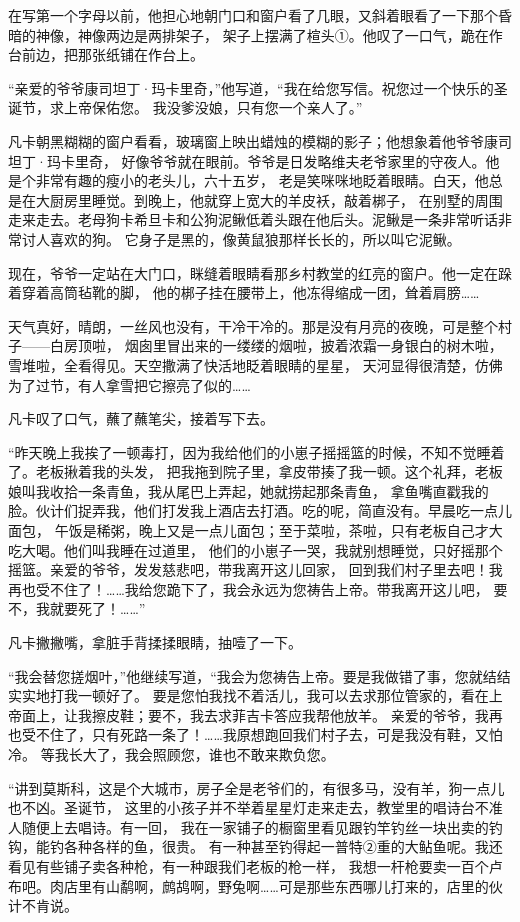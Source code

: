 \documentclass[12pt,UTF8]{ctexbook}
\begin{document}
在写第一个字母以前，他担心地朝门口和窗户看了几眼，又斜着眼看了一下那个昏暗的神像，神像两边是两排架子，
架子上摆满了楦头①。他叹了一口气，跪在作台前边，把那张纸铺在作台上。

“亲爱的爷爷康司坦丁·玛卡里奇，”他写道，“我在给您写信。祝您过一个快乐的圣诞节，求上帝保佑您。
我没爹没娘，只有您一个亲人了。”

凡卡朝黑糊糊的窗户看看，玻璃窗上映出蜡烛的模糊的影子；他想象着他爷爷康司坦丁·玛卡里奇，
好像爷爷就在眼前。爷爷是日发略维夫老爷家里的守夜人。他是个非常有趣的瘦小的老头儿，六十五岁，
老是笑咪咪地眨着眼睛。白天，他总是在大厨房里睡觉。到晚上，他就穿上宽大的羊皮袄，敲着梆子，
在别墅的周围走来走去。老母狗卡希旦卡和公狗泥鳅低着头跟在他后头。泥鳅是一条非常听话非常讨人喜欢的狗。
它身子是黑的，像黄鼠狼那样长长的，所以叫它泥鳅。

现在，爷爷一定站在大门口，眯缝着眼睛看那乡村教堂的红亮的窗户。他一定在跺着穿着高筒毡靴的脚，
他的梆子挂在腰带上，他冻得缩成一团，耸着肩膀……

天气真好，晴朗，一丝风也没有，干冷干冷的。那是没有月亮的夜晚，可是整个村子——白房顶啦，
烟囱里冒出来的一缕缕的烟啦，披着浓霜一身银白的树木啦，雪堆啦，全看得见。天空撒满了快活地眨着眼睛的星星，
天河显得很清楚，仿佛为了过节，有人拿雪把它擦亮了似的……

凡卡叹了口气，蘸了蘸笔尖，接着写下去。

“昨天晚上我挨了一顿毒打，因为我给他们的小崽子摇摇篮的时候，不知不觉睡着了。老板揪着我的头发，
把我拖到院子里，拿皮带揍了我一顿。这个礼拜，老板娘叫我收拾一条青鱼，我从尾巴上弄起，她就捞起那条青鱼，
拿鱼嘴直戳我的脸。伙计们捉弄我，他们打发我上酒店去打酒。吃的呢，简直没有。早晨吃一点儿面包，
午饭是稀粥，晚上又是一点儿面包；至于菜啦，茶啦，只有老板自己才大吃大喝。他们叫我睡在过道里，
他们的小崽子一哭，我就别想睡觉，只好摇那个摇篮。亲爱的爷爷，发发慈悲吧，带我离开这儿回家，
回到我们村子里去吧！我再也受不住了！……我给您跪下了，我会永远为您祷告上帝。带我离开这儿吧，
要不，我就要死了！……”

凡卡撇撇嘴，拿脏手背揉揉眼睛，抽噎了一下。

“我会替您搓烟叶，”他继续写道，“我会为您祷告上帝。要是我做错了事，您就结结实实地打我一顿好了。
要是您怕我找不着活儿，我可以去求那位管家的，看在上帝面上，让我擦皮鞋；要不，我去求菲吉卡答应我帮他放羊。
亲爱的爷爷，我再也受不住了，只有死路一条了！……我原想跑回我们村子去，可是我没有鞋，又怕冷。
等我长大了，我会照顾您，谁也不敢来欺负您。

“讲到莫斯科，这是个大城市，房子全是老爷们的，有很多马，没有羊，狗一点儿也不凶。圣诞节，
这里的小孩子并不举着星星灯走来走去，教堂里的唱诗台不准人随便上去唱诗。有一回，
我在一家铺子的橱窗里看见跟钓竿钓丝一块出卖的钓钩，能钓各种各样的鱼，很贵。
有一种甚至钓得起一普特②重的大鲇鱼呢。我还看见有些铺子卖各种枪，有一种跟我们老板的枪一样，
我想一杆枪要卖一百个卢布吧。肉店里有山鹬啊，鹧鸪啊，野兔啊……可是那些东西哪儿打来的，店里的伙计不肯说。
\end{document}
